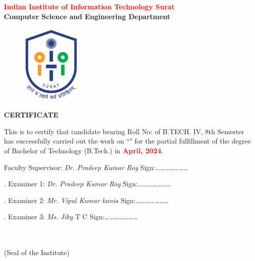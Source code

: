 \thispagestyle{plain}

\begin{center}
{\Large {\bf {\textcolor{red}{Indian Institute of Information Technology Surat}\\Computer Science and Engineering Department}}}
\end{center}

\vspace{1.25cm}
\justify


\begin{figure}[h]
    \centering
    \includegraphics[width=30mm]{Formalities/IIIT_Surat_logo.jpg}
\end{figure}

\begin{center}
{\Large {\bf \uppercase{Certificate}}}
\end{center}
\vspace{1.5cm}
\normalsize
\noindent This is to certify that candidate \textcolor{red}{\textbf{\myname}} bearing Roll No: \textcolor{red}{\textbf{\myrollno}} of B.TECH. IV, 8th Semester has successfully carried out the work on  ``\textcolor{red}{\textbf{\myprojectname}}" for the partial fulfillment of the degree of Bachelor of Technology (B.Tech.) in \textcolor{red}{\textbf{April, 2024}}.

\vspace{3\baselineskip}

\noindent Faculty Supervisor: \emph{Dr. Pradeep Kumar Roy}   \hfill Sign:\emph{…………………}\\
\vspace{1cm}

.  Examiner 1: \emph{ Dr. Pradeep Kumar Roy} \hfill Sign:\emph{…………………}\\
\vspace{0.3cm}

.  Examiner 2: \emph{ Mr. Vipul Kumar kania} \hfill Sign:\emph{…………………}\\
\vspace{0.3cm}

.  Examiner 3: \emph{ Ms. Jiby} T C \hfill Sign:\emph{…………………}\\
\vspace{0.3cm}

\begin{flushright} 

{\small \bf \textcolor{white}{}}\\
{\small \bf \textcolor{white}{}}\\
{\small (Seal of the Institute)} \\
\end{flushright}



